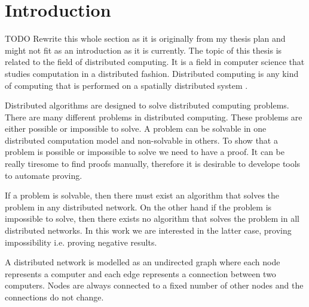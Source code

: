 
\section{Introduction}  \label{sec:introduction}
{\color{red}TODO Rewrite this whole section as it is originally from my thesis plan and might not fit as an introduction as it is currently.} %
The topic of this thesis is related to the field of distributed computing.
It is a field in computer science that studies computation in a distributed fashion.
Distributed computing is any kind of computing that is performed on a spatially distributed system
\cite{DBLP:books/el/leeuwen90/LamportL90}.

Distributed algorithms are designed to solve distributed computing problems.
There are many different problems in distributed computing.
These problems are either possible or impossible to solve.
A problem can be solvable in one distributed computation model and non-solvable in others.
To show that a problem is possible or impossible to solve we need to have a proof.
It can be really tiresome to find proofs manually, therefore it is desirable to develope tools to automate proving.

If a problem is solvable, then there must exist an algorithm that solves the problem in any distributed network.
On the other hand if the problem is impossible to solve, then there exists no algorithm that solves the problem in all distributed networks.
In this work we are interested in the latter case, proving impossibility i.e. proving negative results.

A distributed network is modelled as an undirected graph where each node represents a computer and each edge represents a connection between two computers.
Nodes are always connected to a fixed number of other nodes and the connections do not change.
\cite{DBLP:journals/siamcomp/NaorS95}

